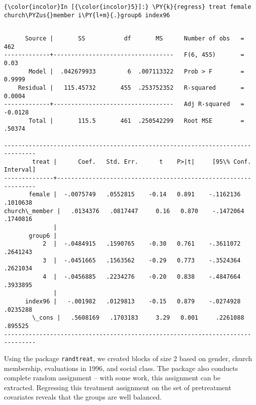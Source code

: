 \documentclass[11pt,notitlepage]{article}\usepackage[]{graphicx}\usepackage[]{color}
\makeatletter
\newenvironment{kframe}{%
 \def\at@end@of@kframe{}%
 \ifinner\ifhmode%
  \def\at@end@of@kframe{\end{minipage}}%
  \begin{minipage}{\columnwidth}%
 \fi\fi%
 \def\FrameCommand##1{\hskip\@totalleftmargin \hskip-\fboxsep
 \colorbox{shadecolor}{##1}\hskip-\fboxsep
     \hskip-\linewidth \hskip-\@totalleftmargin \hskip\columnwidth}%
 \MakeFramed {\advance\hsize-\width
   \@totalleftmargin\z@ \linewidth\hsize
   \@setminipage}}%
 {\par\unskip\endMakeFramed%
 \at@end@of@kframe}
\newenvironment{knitrout}{}{} %
\makeatother
\begin{document}
\begin{enumerate}[a)]
\begin{knitrout}
\begin{kframe}
    \begin{Verbatim}[commandchars=\\\{\}]
{\color{incolor}In [{\color{incolor}5}]:} \PY{k}{regress} treat female church\PYZus{}member i\PY{l+m}{.}group6 index96
\end{Verbatim}

    \begin{Verbatim}[commandchars=\\\{\}]

      Source |       SS           df       MS      Number of obs   =       462
-------------+----------------------------------   F(6, 455)       =      0.03
       Model |  .042679933         6  .007113322   Prob > F        =    0.9999
    Residual |   115.45732       455  .253752352   R-squared       =    0.0004
-------------+----------------------------------   Adj R-squared   =   -0.0128
       Total |       115.5       461  .250542299   Root MSE        =    .50374

-------------------------------------------------------------------------------
        treat |      Coef.   Std. Err.      t    P>|t|     [95\% Conf. Interval]
--------------+----------------------------------------------------------------
       female |  -.0075749   .0552815    -0.14   0.891    -.1162136    .1010638
church\_member |   .0134376   .0817447     0.16   0.870    -.1472064    .1740816
              |
       group6 |
           2  |  -.0484915   .1590765    -0.30   0.761    -.3611072    .2641243
           3  |  -.0451665   .1563562    -0.29   0.773    -.3524364    .2621034
           4  |  -.0456885   .2234276    -0.20   0.838    -.4847664    .3933895
              |
      index96 |   -.001982   .0129813    -0.15   0.879    -.0274928    .0235288
        \_cons |   .5608169   .1703183     3.29   0.001     .2261088     .895525
-------------------------------------------------------------------------------

    \end{Verbatim}
\end{kframe}
\end{knitrout}

Using the package \texttt{randtreat}, we created blocks of size 2 based on gender, church membership, evaluations in 1996, and social class. The package also conducts complete random assignment -- with some work, this assignment can be extracted. Regressing this treatment assignment on the set of pretreatment covariates reveals that the groups are well balanced.


\end{enumerate}
\end{document}

